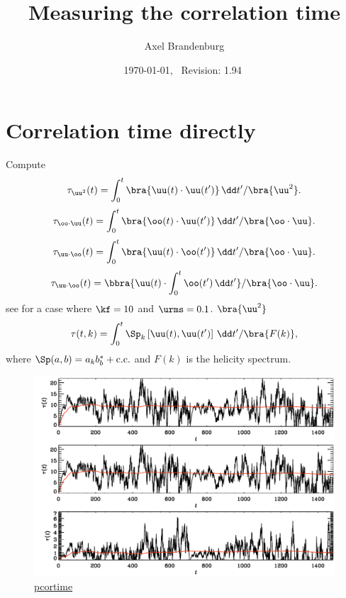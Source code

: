 \documentclass[twocolumn]{article}
\title{Measuring the correlation time}
\author{Axel Brandenburg}
\date{\today,~ $ $Revision: 1.94 $ $}
\begin{document}
\maketitle

\section{Correlation time directly}



Compute
\begin{equation}
\tau_{\uu^2}(t)=\int_0^t \bra{\uu(t)\cdot\uu(t')}\,\dd t'/\bra{\uu^2}.
\end{equation}
\begin{equation}
\tau_{\oo\cdot\uu}(t)=\int_0^t \bra{\oo(t)\cdot\uu(t')}\,\dd t'/\bra{\oo\cdot\uu}.
\end{equation}
\begin{equation}
\tau_{\uu\cdot\oo}(t)=\int_0^t \bra{\uu(t)\cdot\oo(t')}\,\dd t'/\bra{\oo\cdot\uu}.
\end{equation}
\begin{equation}
\tau_{\uu\cdot\oo}(t)=\bbra{\uu(t)\cdot\int_0^t \oo(t')\,\dd t'}/\bra{\oo\cdot\uu}.
\end{equation}
see  for a case where $\kf=10$ and $\urms=0.1$.
$\bra{\uu^2}$
\begin{equation}
\tau(t,k)=\int_0^t \Sp_k\left[\uu(t),\uu(t')\right]\,\dd t'/\bra{F(k)},
\end{equation}
where $\Sp(a,b)=a_k b_b^* + \mbox{c.c.}$ and $F(k)$ is the helicity spectrum.

\begin{figure}[h!]\begin{center}
\includegraphics[width=\columnwidth]{pcortime}
\end{center}\caption[]{
\url{pcortime}
}\label{pcortime}\end{figure}
\end{document}
